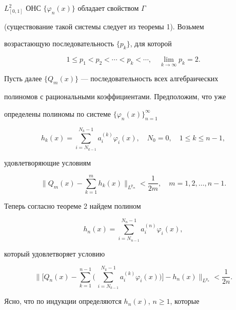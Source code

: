 $L^2_{[0,1]}$ ОНС $\{\varphi_n(x)\}$ обладает свойством $\Gamma$ 


(существование такой системы следует из теоремы 1). Возьмем 


возрастающую последовательность $\{p_k\}$, для которой 


\begin{equation} 


1\le p_1<p_2<\dotsb<p_k<\dotsb,\quad 


\lim_{k\to\infty}p_k=2. 


\end{equation} 


Пусть далее $\{Q_m(x)\}$ --- последовательность всех алгебраических 


полиномов с рациональными коэффициентами. Предположим, что уже 


определены полиномы по системе $\{\varphi_n(x)\}^\infty_{n=1}$ 


$$ 


h_k(x)=\sum^{N_k-1}_{i=N_{k-1}}a^{(k)}_i\varphi_i(x),\quad 


N_0=0,\quad 1\le k\le n-1, 


$$ 


удовлетворяющие условиям 


$$ 


\bigg\|Q_m(x)-\sum^m_{k=1}h_k(x)\bigg\|_{L^{p_m}}<\frac{1}{2m},\quad 


m=1,2,\dotsc,n-1. 


$$ 


Теперь согласно теореме 2 найдем полином 


\begin{equation} 


h_n(x)=\sum^{N_n-1}_{i=N_{n-1}}a^{(n)}_i\varphi_i(x), 


\end{equation} 


который удовлетворяет условию 


\begin{equation} 


\bigg\|\bigg[Q_n(x)-\sum^{n-1}_{k=1}\bigg(\, 


\sum^{N_k-1}_{i=N_{k-1}}a^{(k)}_i\varphi_i(x)\bigg)\bigg]- 


h_n(x)\bigg\|_{L^{p_n}}<\frac{1}{2n}. 


\end{equation} 


Ясно, что по индукции определяются $h_n(x)$, $n\ge 1$, которые 


